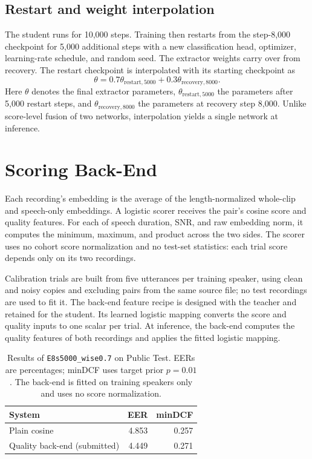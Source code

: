 \documentclass[11pt]{article}
\begin{document}
\subsection{Restart and weight interpolation}
The student runs for 10,000 steps. Training then restarts from the step-8,000 checkpoint for 5,000 additional steps with a new classification head, optimizer, learning-rate schedule, and random seed. The extractor weights carry over from recovery. The restart checkpoint is interpolated with its starting checkpoint as
\begin{equation}
 \theta=0.7\theta_{\mathrm{restart},5000}
       +0.3\theta_{\mathrm{recovery},8000}.
\end{equation}
Here $\theta$ denotes the final extractor parameters, $\theta_{\mathrm{restart},5000}$ the parameters after 5,000 restart steps, and $\theta_{\mathrm{recovery},8000}$ the parameters at recovery step 8,000. Unlike score-level fusion of two networks, interpolation yields a single network at inference.

\section{Scoring Back-End}
\label{sec:scoring}
Each recording's embedding is the average of the length-normalized whole-clip and speech-only embeddings. A logistic scorer receives the pair's cosine score and quality features. For each of speech duration, SNR, and raw embedding norm, it computes the minimum, maximum, and product across the two sides. The scorer uses no cohort score normalization and no test-set statistics: each trial score depends only on its two recordings.

Calibration trials are built from five utterances per training speaker, using clean and noisy copies and excluding pairs from the same source file; no test recordings are used to fit it. The back-end feature recipe is designed with the teacher and retained for the student. Its learned logistic mapping converts the score and quality inputs to one scalar per trial. At inference, the back-end computes the quality features of both recordings and applies the fitted logistic mapping.

\begin{table}[t]
\centering
\small
\setlength{\tabcolsep}{3.5pt}
\begin{tabular}{@{}lrr@{}}
\toprule
System & EER & minDCF \\
\midrule
Plain cosine & 4.853 & 0.257 \\
Quality back-end (submitted) & 4.449 & 0.271 \\
\bottomrule
\end{tabular}
\caption{Results of \nolinkurl{E8s5000_wise0.7} on Public Test. EERs are percentages; minDCF uses target prior $p=0.01$. The back-end is fitted on training speakers only and uses no score normalization.}
\label{tab:final}
\end{table}
\end{document}
